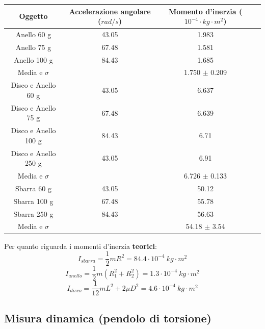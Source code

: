 \begin{center}
\begin{tabular}{c|ccc}
Oggetto & Accelerazione angolare ($rad/s$) & Momento d'inerzia ($ 10^{-4} \cdot kg\cdot m^2$) \\
\midrule
Anello 60 g&43.05 & 1.983 \\
Anello 75 g &67.48 & 1.581 \\
Anello 100 g&84.43 & 1.685\\
\midrule
Media e $\sigma$&&1.750 $\pm$ 0.209 \\
\midrule
Disco e Anello 60 g&43.05 & 6.637 \\
Disco e Anello 75 g &67.48 & 6.639 \\
Disco e Anello 100 g&84.43 & 6.71\\
Disco e Anello 250 g&43.05 &  6.91 \\
\midrule
Media e $\sigma$&& 6.726 $\pm$ 0.133\\
\midrule
Sbarra 60 g&43.05 & 50.12\\
Sbarra 100 g &67.48 & 55.78 \\
Sbarra 250 g&84.43 & 56.63\\
\midrule
Media e $\sigma$&& 54.18 $\pm$ 3.54\\
\midrule
\end{tabular}
\end{center}

Per quanto riguarda i momenti d'inerzia \textbf{teorici}:
$$ I_{sbarra} = \frac{1}{2} m R^2 = 84.4\cdot 10^{-4}\ kg\cdot m^2$$
$$ I_{anello} =\frac{1}{2} m (R^2_1 + R^2_2) = 1.3\cdot 10^{-4} \ kg\cdot m^2$$
$$ I_{disco} = \frac{1}{12} m L^2 + 2 \mu D^2 = 4.6\cdot 10^{-4} \ kg \cdot m^2$$



\subsection{Misura dinamica (pendolo di torsione)}

